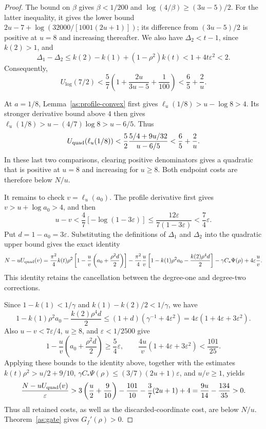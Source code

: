 \documentclass[11pt,letterpaper]{amsart}
\newcommand{\1}{\mathbf 1}
\numberwithin{equation}{section}
\begin{document}
\begin{proof}
The bound on $\beta$ gives $\beta<1/200$ and
$\log(4/\beta)\ge(3u-5)/2$.
For the latter inequality, it gives the lower bound
$2u-7+\log(32000/[1001(2u+1)])$; its difference from
$(3u-5)/2$ is positive at $u=8$ and increasing thereafter.
We also have $\Delta_2<t-1$, since $k(2)>1$, and
\[
 \Delta_1-\Delta_2
 \le k(2)-k(1)+(1-\rho^2)k(t)
 <1+4t\varepsilon^2<2.
\]
Consequently,
\[
 U_{\log}(7/2)
 <\frac57\left(1+\frac{2u}{3u-5}+\frac1{100}\right)
 <\frac65+\frac2u.
\]

At $a=1/8$, Lemma~\ref{as:profile-convex} first gives
$\ell_u(1/8)>u-\log8>4$.
Its stronger derivative bound above $4$ then gives
$\ell_u(1/8)>u-(4/7)\log8>u-6/5$.
Thus
\[
 U_{\rm quad}(\ell_u(1/8))
 <\frac52\frac{5/4+9u/32}{u-6/5}
 <\frac65+\frac2u.
\]
In these last two comparisons, clearing positive denominators
gives a quadratic that is positive at $u=8$ and increasing
for $u\ge8$. Both endpoint costs are therefore below $N/u$.

It remains to check $v=\ell_u(a_0)$.
The profile derivative first gives $v>u+\log a_0>4$,
and then
\[
 u-v<\frac47[-\log(1-3\varepsilon)]
 \le\frac{12\varepsilon}{7(1-3\varepsilon)}
 <\frac74\varepsilon.
\]
Put $d=1-a_0=3\varepsilon$.
Substituting the definitions of $\Delta_1$ and $\Delta_2$
into the quadratic upper bound gives the exact identity
\[
 N-uU_{\rm quad}(v)
 =\frac{\pi^2}{4}k(t)\rho^2
       \left[1-\frac uv\left(a_0+\frac{\rho^2d}{2}\right)\right]-\frac{\pi^2}{4}\frac uv
       \left[1-k(1)\rho^2a_0-\frac{k(2)\rho^4d}{2}\right]-\gamma C_*\Psi(\rho)+4\varepsilon\frac uv.
\]
This identity retains the cancellation between the degree-one
and degree-two corrections.

Since $1-k(1)<1/\gamma$ and
$k(1)-k(2)/2<1/\gamma$, we have
\[
 1-k(1)\rho^2a_0-\frac{k(2)\rho^4d}{2}
 \le(1+d)(\gamma^{-1}+4\varepsilon^2)
 =4\varepsilon(1+4\varepsilon+3\varepsilon^2).
\]
Also $u-v<7\varepsilon/4$, $u\ge8$, and
$\varepsilon<1/2500$ give
\[
 1-\frac uv\left(a_0+\frac{\rho^2d}{2}\right)
 \ge\frac54\varepsilon,\qquad
 \frac{4u}{v}(1+4\varepsilon+3\varepsilon^2)<\frac{101}{25}.
\]
Applying these bounds to the identity above, together with the estimates
$k(t)\rho^2>u/2+9/10$,
$\gamma C_*\Psi(\rho)\le(3/7)(2u+1)\varepsilon$, and $u/v\ge1$,
yields
\[
 \frac{N-uU_{\rm quad}(v)}{\varepsilon}>3\left(\frac u2+\frac9{10}\right)
       -\frac{101}{10}-\frac37(2u+1)+4=\frac{9u}{14}-\frac{134}{35}>0.
\]
Thus all retained costs, as well as the discarded-coordinate
cost, are below $N/u$.
Theorem~\ref{as:gate} gives $G_f'(\rho)>0$.
\end{proof}
\end{document}
